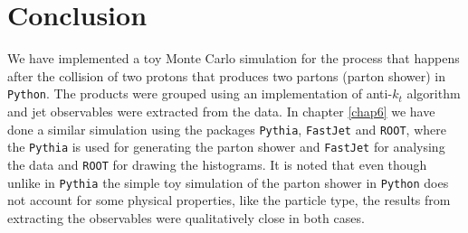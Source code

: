 \chapter{Conclusion}

We have implemented a toy Monte Carlo simulation for the process that happens after the collision of two protons that produces two partons (parton shower) in \verb+Python+. The products were grouped using an implementation of anti-$k_t$ algorithm and jet observables were extracted from the data. In chapter \ref{chap6} we have done a similar simulation  using the packages \verb+Pythia+, \verb+FastJet+ and \verb+ROOT+, where the \verb+Pythia+ is used for generating the parton shower and \verb+FastJet+ for analysing the data and \verb+ROOT+ for drawing the histograms. It is noted that even though unlike in \verb+Pythia+ the simple toy simulation of the parton shower in \verb+Python+ does not account for some physical properties, like the particle type, the results from extracting the observables were qualitatively close in both cases.      